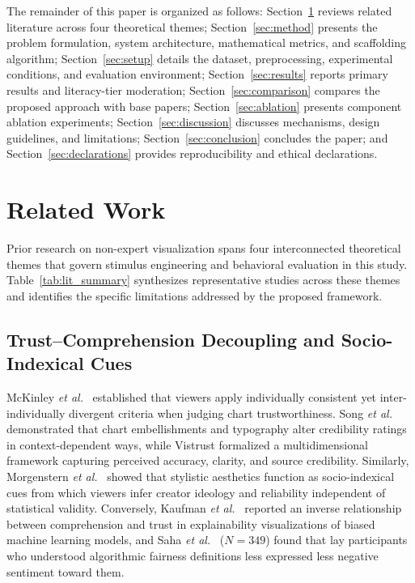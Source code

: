 \documentclass[conference]{IEEEtran}
\begin{document}
The remainder of this paper is organized as follows: Section~\ref{sec:related} reviews related literature across four theoretical themes; Section~\ref{sec:method} presents the problem formulation, system architecture, mathematical metrics, and scaffolding algorithm; Section~\ref{sec:setup} details the dataset, preprocessing, experimental conditions, and evaluation environment; Section~\ref{sec:results} reports primary results and literacy-tier moderation; Section~\ref{sec:comparison} compares the proposed approach with base papers; Section~\ref{sec:ablation} presents component ablation experiments; Section~\ref{sec:discussion} discusses mechanisms, design guidelines, and limitations; Section~\ref{sec:conclusion} concludes the paper; and Section~\ref{sec:declarations} provides reproducibility and ethical declarations.

\section{Related Work}
\label{sec:related}
Prior research on non-expert visualization spans four interconnected theoretical themes that govern stimulus engineering and behavioral evaluation in this study. Table~\ref{tab:lit_summary} synthesizes representative studies across these themes and identifies the specific limitations addressed by the proposed framework.

\subsection{Trust--Comprehension Decoupling and Socio-Indexical Cues}
McKinley \textit{et al.}\ \cite{mckinley2025} established that viewers apply individually consistent yet inter-individually divergent criteria when judging chart trustworthiness. Song \textit{et al.}\ \cite{song2026} demonstrated that chart embellishments and typography alter credibility ratings in context-dependent ways, while Vistrust \cite{elhamdadi2024} formalized a multidimensional framework capturing perceived accuracy, clarity, and source credibility. Similarly, Morgenstern \textit{et al.}\ \cite{morgenstern2026} showed that stylistic aesthetics function as socio-indexical cues from which viewers infer creator ideology and reliability independent of statistical validity. Conversely, Kaufman \textit{et al.}\ \cite{kaufman2026} reported an inverse relationship between comprehension and trust in explainability visualizations of biased machine learning models, and Saha \textit{et al.}\ \cite{saha2020} ($N = 349$) found that lay participants who understood algorithmic fairness definitions less expressed less negative sentiment toward them.
\end{document}
